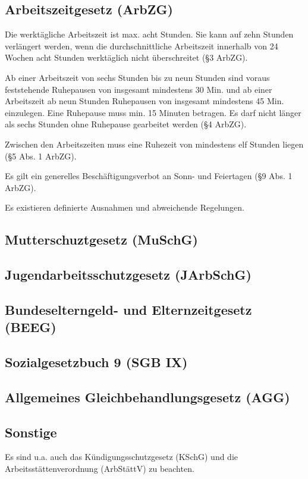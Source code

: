 \subsection{Arbeitszeitgesetz (ArbZG)}

Die werktägliche Arbeitszeit ist max. acht Stunden. Sie kann auf zehn Stunden verlängert werden, wenn die durchschnittliche Arbeitszeit innerhalb von 24 Wochen acht Stunden werktäglich nicht überschreitet (§3 ArbZG).

Ab einer Arbeitszeit von sechs Stunden bis zu neun Stunden sind voraus feststehende Ruhepausen von insgesamt mindestens 30 Min. und ab einer Arbeitszeit ab neun Stunden Ruhepausen von insgesamt mindestens 45 Min. einzulegen. Eine Ruhepause muss min. 15 Minuten betragen. Es darf nicht länger als sechs Stunden ohne Ruhepause gearbeitet werden (§4 ArbZG).

Zwischen den Arbeitszeiten muss eine Ruhezeit von mindestens elf Stunden liegen (§5 Abs. 1 ArbZG).

Es gilt ein generelles Beschäftigungsverbot an Sonn- und Feiertagen (§9 Abs. 1 ArbZG).

Es existieren definierte Ausnahmen und abweichende Regelungen.

\subsection{Mutterschuztgesetz (MuSchG)}

\subsection{Jugendarbeitsschutzgesetz (JArbSchG)}

\subsection{Bundeselterngeld- und Elternzeitgesetz (BEEG)}

\subsection{Sozialgesetzbuch 9 (SGB IX)}

\subsection{Allgemeines Gleichbehandlungsgesetz (AGG)}

\subsection{Sonstige}

Es sind u.a. auch das Kündigungsschutzgesetz (KSchG) und die Arbeitsstättenverordnung (ArbStättV) zu beachten.
